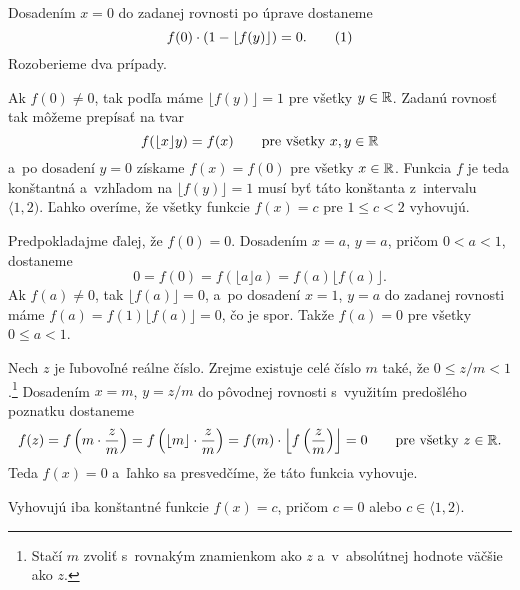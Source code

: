 {%
Dosadením $x=0$ do zadanej rovnosti po úprave dostaneme
$$
f(0)\cdot\left(1-\lfloor f(y)\rfloor\right)=0.
\tag1
$$
Rozoberieme dva prípady.

\smallskip
Ak $f(0)\ne0$, tak podľa  máme $\lfloor f(y)\rfloor=1$ pre všetky $y\in\Bbb R$. Zadanú rovnosť tak môžeme prepísať na tvar
$$
f(\lfloor x\rfloor y)=f(x)\qquad\text{pre všetky $x,y\in\Bbb R$}
$$
a~po dosadení $y=0$ získame $f(x)=f(0)$ pre všetky $x\in\Bbb R$. Funkcia $f$ je teda konštantná a~vzhľadom na $\lfloor f(y)\rfloor=1$ musí byť táto konštanta z~intervalu $\langle 1,2)$. Ľahko overíme, že všetky funkcie $f(x)=c$ pre $1\le c<2$ vyhovujú.

\smallskip
Predpokladajme ďalej, že $f(0)=0$. Dosadením $x=a$, $y=a$, pričom $0<a<1$, dostaneme
$$
0=f(0)=f(\lfloor a\rfloor a)=f(a)\lfloor f(a)\rfloor.
$$
Ak $f(a)\ne0$, tak $\lfloor f(a)\rfloor=0$, a~po dosadení $x=1$, $y=a$ do zadanej rovnosti máme $f(a)=f(1)\lfloor f(a)\rfloor=0$, čo je spor. Takže $f(a)=0$ pre všetky $0\le a<1$.

Nech $z$ je ľubovoľné reálne číslo. Zrejme existuje celé číslo $m$ také, že ${0\le z/m<1}$.\footnote{Stačí $m$ zvoliť s~rovnakým znamienkom ako $z$ a~v~absolútnej hodnote väčšie ako $z$.} Dosadením $x=m$, $y=z/m$ do pôvodnej rovnosti s~využitím predošlého poznatku dostaneme
$$
  f(z)=f\left(m\cdot\frac zm\right)=f\left(\lfloor m\rfloor\cdot\frac zm\right)=f(m)\cdot\left\lfloor f\left(\frac zm\right)\right\rfloor=0
  \qquad\text{pre všetky $z\in\Bbb R$.}
$$
Teda $f(x)=0$ a~ľahko sa presvedčíme, že táto funkcia vyhovuje.

\zaver
Vyhovujú iba konštantné funkcie $f(x)=c$, pričom $c=0$ alebo $c\in\langle1,2)$.
}

